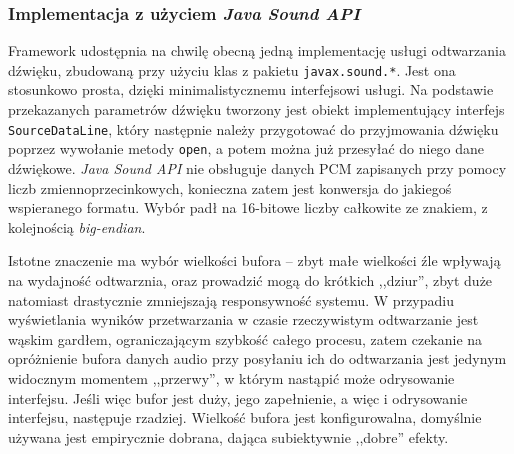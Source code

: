 \subsubsection{Implementacja z użyciem \emph{Java Sound API}}

Framework udostępnia na chwilę obecną jedną implementację usługi odtwarzania dźwięku, zbudowaną przy
użyciu klas z pakietu \texttt{javax.sound.*}. Jest ona stosunkowo prosta, dzięki minimalistycznemu
interfejsowi usługi. Na podstawie przekazanych parametrów dźwięku tworzony jest obiekt
implementujący interfejs \texttt{SourceDataLine}, który następnie należy przygotować do przyjmowania
dźwięku poprzez wywołanie metody \texttt{open}, a potem można już przesyłać do niego dane dźwiękowe.
\emph{Java Sound API} nie obsługuje danych PCM zapisanych przy pomocy liczb zmiennoprzecinkowych,
konieczna zatem jest konwersja do jakiegoś wspieranego formatu. Wybór padł na 16-bitowe liczby
całkowite ze znakiem, z kolejnością \textit{big-endian}.

\begin{NoteLong}
Istotne znaczenie ma wybór wielkości bufora -- zbyt małe wielkości źle wpływają na wydajność
odtwarznia, oraz prowadzić mogą do krótkich ,,dziur'', zbyt duże natomiast drastycznie zmniejszają
responsywność systemu. W przypadiu wyświetlania wyników przetwarzania w czasie rzeczywistym
odtwarzanie jest wąskim gardłem, ograniczającym szybkość całego procesu, zatem czekanie na
opróżnienie bufora danych audio przy posyłaniu ich do odtwarzania jest jedynym widocznym momentem
,,przerwy'', w którym nastąpić może odrysowanie interfejsu. Jeśli więc bufor jest duży, jego
zapełnienie, a więc i odrysowanie interfejsu, następuje rzadziej. Wielkość bufora jest
konfigurowalna, domyślnie używana jest empirycznie dobrana, dająca subiektywnie ,,dobre'' efekty.
\end{NoteLong}
